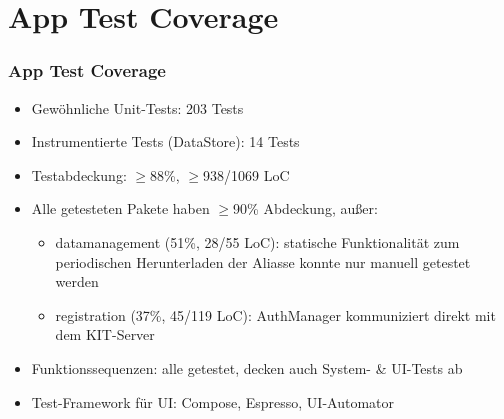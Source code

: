 \section*{App Test Coverage}

\begin{frame}\frametitle{App Test Coverage}
    \begin{itemize}
        \item Gewöhnliche Unit-Tests: 203 Tests
        \item Instrumentierte Tests (DataStore): 14 Tests
        \item Testabdeckung: $\geq$88\%, $\geq$938/1069 LoC
        \item Alle getesteten Pakete haben $\geq$90\% Abdeckung, außer: 
        \begin{itemize}
            \item datamanagement (51\%, 28/55 LoC): statische Funktionalität zum periodischen Herunterladen der Aliasse konnte nur manuell getestet werden
            \item registration (37\%, 45/119 LoC): AuthManager kommuniziert direkt mit dem KIT-Server    
        \end{itemize}
        \item Funktionssequenzen: alle getestet, decken auch System- \& UI-Tests ab
        \item Test-Framework für UI: Compose, Espresso, UI-Automator
        \end{itemize}
\end{frame}